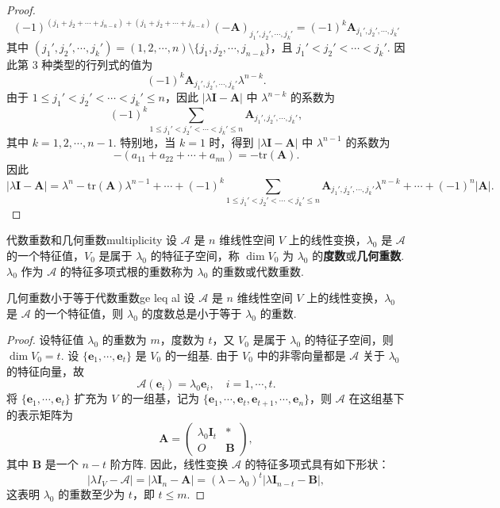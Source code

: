 \documentclass[12pt, a4paper]{ctexart}
\begin{document}
\begin{proof}
	\[
	(-1)^{(j_1 + j_2 + \cdots + j_{n-k}) + (j_1 + j_2 + \cdots + j_{n-k})} (-\bm A)_{j_1', j_2', \cdots, j_k'} = (-1)^k \bm A_{j_1', j_2', \cdots, j_k'}
	\]
	其中 $ (j_1', j_2', \cdots, j_k') = (1, 2, \cdots, n) \setminus \{j_1, j_2, \cdots, j_{n-k}\} $，且 $ j_1' < j_2' < \cdots < j_k' $. 因此第 3 种类型的行列式的值为
	\[
	(-1)^k \bm A_{j_1', j_2', \cdots, j_k'} \lambda^{n-k}. 
	\]
	由于 $ 1 \leqslant j_1' < j_2' < \cdots < j_k' \leqslant n $，因此 $ |\lambda\bm{I} - \bm A| $ 中 $ \lambda^{n-k} $ 的系数为
	\[
	(-1)^k \sum_{1 \leqslant j_1' < j_2' < \cdots < j_k' \leqslant n} \bm A_{j_1', j_2', \cdots, j_k'},
	\]
	其中 $ k = 1, 2, \cdots, n-1 $. 特别地，当 $ k = 1 $ 时，得到 $ |\lambda\bm{I} - \bm A| $ 中 $ \lambda^{n-1} $ 的系数为
	\[
	-(a_{11} + a_{22} + \cdots + a_{nn}) = -\text{tr}(\bm A). 
	\]
	因此
	\[
	|\lambda\bm{I} - \bm A| = \lambda^n - \text{tr}(\bm A) \lambda^{n-1} + \cdots + (-1)^k \sum_{1 \leqslant j_1' < j_2' < \cdots < j_k' \leqslant n} \bm A_{j_1', j_2', \cdots, j_k'} \lambda^{n-k} + \cdots + (-1)^n |\bm A|. 
	\]
\end{proof}
\begin{definition}{代数重数和几何重数}{multiplicity}
	设 $\mathcal{A}$ 是 $n$ 维线性空间 $V$ 上的线性变换，$\lambda_0$ 是 $\mathcal{A}$ 的一个特征值，$V_0$ 是属于 $\lambda_0$ 的特征子空间，称 $\dim V_0$ 为 $\lambda_0$ 的\textbf{度数}或\textbf{几何重数}. $\lambda_0$ 作为 $\mathcal{A}$ 的特征多项式根的重数称为 $\lambda_0$ 的重数或代数重数. 
\end{definition}
\begin{proposition}{几何重数小于等于代数重数}{ge leq al}
	设 $\mathcal{A}$ 是 $n$ 维线性空间 $V$ 上的线性变换，$\lambda_0$ 是 $\mathcal{A}$ 的一个特征值，则 $\lambda_0$ 的度数总是小于等于 $\lambda_0$ 的重数. 
\end{proposition}
\begin{proof}
	设特征值 $\lambda_0$ 的重数为 $m$，度数为 $t$，又 $V_0$ 是属于 $\lambda_0$ 的特征子空间，则 $\dim V_0 = t$. 设 $\{\bm{e}_1, \cdots, \bm{e}_t\}$ 是 $V_0$ 的一组基. 由于 $V_0$ 中的非零向量都是 $\mathcal{A}$ 关于 $\lambda_0$ 的特征向量，故
	\[
	\mathcal{A}(\bm{e}_i) = \lambda_0 \bm{e}_i, \quad i = 1, \cdots, t.
	\]
	将 $\{\bm{e}_1, \cdots, \bm{e}_t\}$ 扩充为 $V$ 的一组基，记为 $\{\bm{e}_1, \cdots, \bm{e}_t, \bm{e}_{t+1}, \cdots, \bm{e}_n\}$，则 $\mathcal{A}$ 在这组基下的表示矩阵为
	\[
	\bm A = \begin{pmatrix}
		\lambda_0\bm I_t & * \\
		O & \bm B
	\end{pmatrix},
	\]
	其中 $\bm B$ 是一个 $n-t$ 阶方阵. 因此，线性变换 $\mathcal{A}$ 的特征多项式具有如下形状：
	\[
	|\lambda I_V - \mathcal{A}| = |\lambda \bm I_n - \bm A| = (\lambda - \lambda_0)^t |\lambda\bm I_{n-t} - \bm B|,
	\]
	这表明 $\lambda_0$ 的重数至少为 $t$，即 $t \leqslant m$. 
\end{proof}
\end{document}
